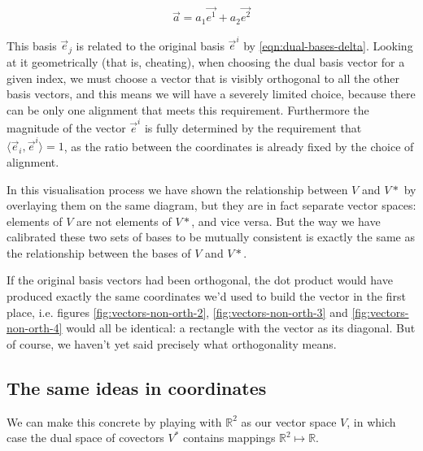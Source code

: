 $$
\vec{a} = a_1 \vec{e^1} + a_2 \vec{e^2}
$$

This basis $\vec{e}_j$ is related to the original basis $\vec{e}^i$ by \eqref{eqn:dual-bases-delta}. Looking at it geometrically (that is, cheating), when choosing the dual basis vector for a given index, we must choose a vector that is visibly orthogonal to all the other basis vectors, and this means we will have a severely limited choice, because there can be only one alignment that meets this requirement. Furthermore the magnitude of the vector $\vec{e}^i$ is fully determined by the requirement that $\langle \vec{e}_i, \vec{e}^i \rangle = 1$, as the ratio between the coordinates is already fixed by the choice of alignment.

In this visualisation process we have shown the relationship between $V$ and $V*$ by overlaying them on the same diagram, but they are in fact separate vector spaces: elements of $V$ are not elements of $V*$, and vice versa. But the way we have calibrated these two sets of bases to be mutually consistent is exactly the same as the relationship between the bases of $V$ and $V*$.

If the original basis vectors had been orthogonal, the dot product would have produced exactly the same coordinates we'd used to build the vector in the first place, i.e. figures \ref{fig:vectors-non-orth-2}, \ref{fig:vectors-non-orth-3} and \ref{fig:vectors-non-orth-4} would all be identical: a rectangle with the vector as its diagonal. But of course, we haven't yet said precisely what orthogonality means.

\subsection{The same ideas in coordinates}

We can make this concrete by playing with $\mathbb{R}^2$ as our vector space $V$, in which case the dual space of covectors $V^*$ contains mappings $\mathbb{R}^2 \mapsto \mathbb{R}$.

